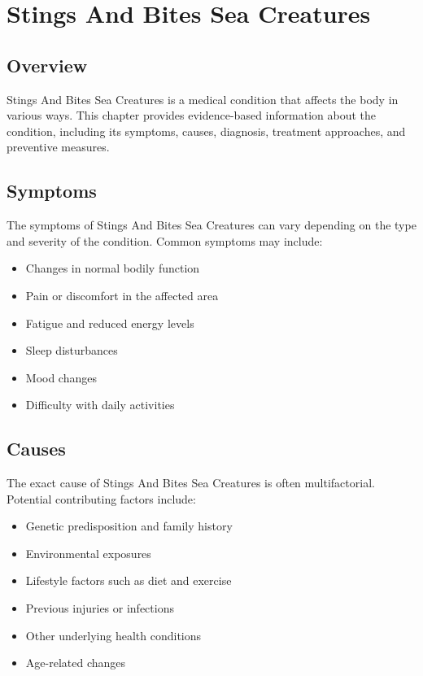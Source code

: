 \chapter{Stings And Bites Sea Creatures}

\section*{Overview}
Stings And Bites Sea Creatures is a medical condition that affects the body in various ways. This chapter provides evidence-based information about the condition, including its symptoms, causes, diagnosis, treatment approaches, and preventive measures.

\section*{Symptoms}
The symptoms of Stings And Bites Sea Creatures can vary depending on the type and severity of the condition. Common symptoms may include:

\begin{itemize}
\item Changes in normal bodily function
\item Pain or discomfort in the affected area
\item Fatigue and reduced energy levels
\item Sleep disturbances
\item Mood changes
\item Difficulty with daily activities
\end{itemize}

\section*{Causes}
The exact cause of Stings And Bites Sea Creatures is often multifactorial. Potential contributing factors include:

\begin{itemize}
\item Genetic predisposition and family history
\item Environmental exposures
\item Lifestyle factors such as diet and exercise
\item Previous injuries or infections
\item Other underlying health conditions
\item Age-related changes
\end{itemize}

